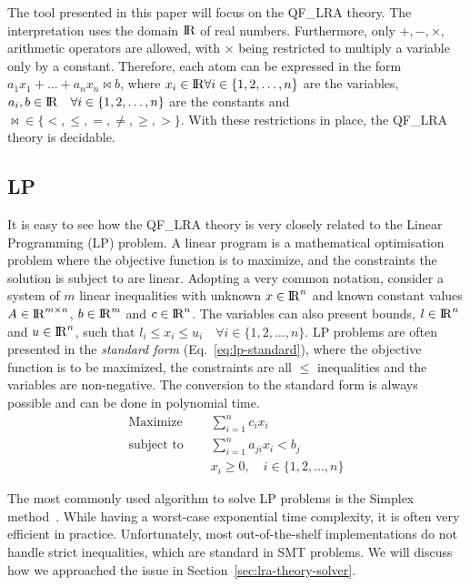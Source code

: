 \documentclass[runningheads]{llncs}
\begin{document}
The tool presented in this paper will focus on the QF\_LRA theory.
The interpretation uses the domain ${\rm I\!R}$ of real numbers.
Furthermore, only $+, -, \times,$ arithmetic operators are allowed, with $\times$ being restricted to multiply a variable only by a constant.
Therefore, each atom can be expressed in the form $a_1x_1 + \ldots + a_nx_n \bowtie b$, where $x_i \in {\rm I\!R} \forall i \in \{1, 2, \dots, n\}$ are the variables, $a_i, b \in {\rm I\!R} \quad \forall i \in \{1, 2, \dots, n\}$ are the constants and $\bowtie \in \{<, \le, =, \ne, \ge, >\}$.
With these restrictions in place, the QF\_LRA theory is decidable.

\subsection{LP}
\label{sec:lp}

It is easy to see how the QF\_LRA theory is very closely related to the Linear Programming (LP) problem.
A linear program is a mathematical optimisation problem where the objective function is to maximize, and the constraints the solution is subject to are linear.
Adopting a very common notation, consider a system of $m$ linear inequalities with unknown $x \in {\rm I\!R}^n$ and known constant values $A \in {\rm I\!R}^{m \times n}$, $b \in {\rm I\!R}^m$ and $c \in {\rm I\!R}^n$.
The variables can also present bounds, $l \in {\rm I\!R}^n$ and $u \in {\rm I\!R}^n$, such that $l_i \le x_i \le u_i \quad \forall i \in \{1, 2, \ldots, n\}$.
LP problems are often presented in the \textit{standard form} (Eq.~\ref{eq:lp-standard}), where the objective function is to be maximized, the constraints are all $\le$ inequalities and the variables are non-negative.
The conversion to the standard form is always possible and can be done in polynomial time.
\begin{equation}
    \label{eq:lp-standard}
    \begin{split}
        \text{Maximize }   \quad & \sum_{i=1}^{n} c_i x_i                      \\
        \text{subject to } \quad & \sum_{i=1}^{n} a_{ji}x_{i} < b_j            \\
        & x_i \ge 0,  \quad i \in \{1, 2, \ldots, n\}
    \end{split}
\end{equation}

The most commonly used algorithm to solve LP problems is the Simplex method~\cite{ref:simplex}.
While having a worst-case exponential time complexity, it is often very efficient in practice.
Unfortunately, most out-of-the-shelf implementations do not handle strict inequalities, which are standard in SMT problems.
We will discuss how we approached the issue in Section~\ref{sec:lra-theory-solver}.
\end{document}
